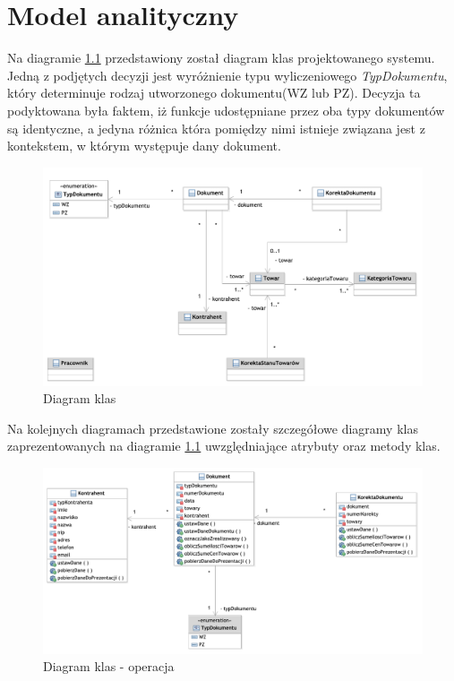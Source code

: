 \chapter{Model analityczny}

Na diagramie \ref{fig:DiagramKlas} przedstawiony został  diagram klas projektowanego systemu.
Jedną z podjętych decyzji jest wyróżnienie typu wyliczeniowego \textit{TypDokumentu}, który determinuje rodzaj utworzonego dokumentu(WZ lub PZ). Decyzja ta podyktowana była faktem, iż funkcje udostępniane przez oba typy dokumentów są identyczne, a jedyna różnica która pomiędzy nimi istnieje związana jest z kontekstem, w którym występuje dany dokument.

\begin{figure}[!htb]
  \begin{center}
    \includegraphics[scale=0.7]{../img/model/diagram_klas.pdf}
  \end{center}
  \caption{Diagram klas}
  \label{fig:DiagramKlas}
\end{figure}
\FloatBarrier

Na kolejnych diagramach przedstawione zostały szczegółowe diagramy klas zaprezentowanych na diagramie \ref{fig:DiagramKlas} uwzględniające atrybuty oraz metody klas.

\begin{figure}[!htb]
  \begin{center}
    \includegraphics[scale=0.7]{../img/model/diagram_operacja.pdf}
  \end{center}
  \caption{Diagram klas - operacja}
  \label{fig:DiagramKlasOperacja}
\end{figure}
\FloatBarrier


